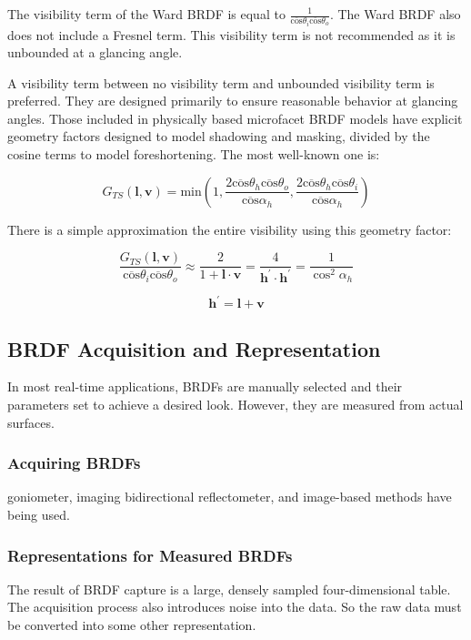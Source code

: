 \documentclass[10pt, a4paper]{article}
\begin{document}
        The visibility term of the Ward BRDF is equal to $\frac{1}{\overline{\text{cos}}\theta_i\overline{\text{cos}}\theta_o}$. The Ward BRDF also does not include a Fresnel term. This visibility term is not recommended as it is unbounded at a glancing angle.   

        A visibility term between no visibility term and unbounded visibility term is preferred. They are designed primarily to ensure reasonable behavior at glancing angles. Those included in physically based microfacet BRDF models have explicit geometry factors designed to model shadowing and masking, divided by the cosine terms to model foreshortening. The most well-known one is: 

        $$G_{TS}(\textbf{l}, \textbf{v}) = \text{min}(1, \frac{2\overline{\text{cos}}\theta_h\overline{\text{cos}}\theta_o}{\overline{\text{cos}}\alpha_h}, \frac{2\overline{\text{cos}}\theta_h\overline{\text{cos}}\theta_i}{\overline{\text{cos}}\alpha_h})$$

        There is a simple approximation the entire visibility using this geometry factor: 

        $$\frac{G_{TS}(\textbf{l}, \textbf{v})}{\overline{\text{cos}}\theta_i\overline{\text{cos}}\theta_o} \approx \frac{2}{1 + \textbf{l}\cdot\textbf{v}} = \frac{4}{\textbf{h}^{'}\cdot\textbf{h}^{'}} = \frac{1}{\cos^2{\alpha_h}}$$

        $$\textbf{h}^{'} = \textbf{l} + \textbf{v}$$

    \subsection{BRDF Acquisition and Representation}
        In most real-time applications, BRDFs are manually selected and their parameters set to achieve a desired look. However, they are measured from actual surfaces. 
        \subsubsection{Acquiring BRDFs}
            goniometer, imaging bidirectional reflectometer, and image-based methods have being used.
        \subsubsection{Representations for Measured BRDFs}
            The result of BRDF capture is a large, densely sampled four-dimensional table. The acquisition process also introduces noise into the data. So the raw data must be converted into some other representation. 
\end{document}
